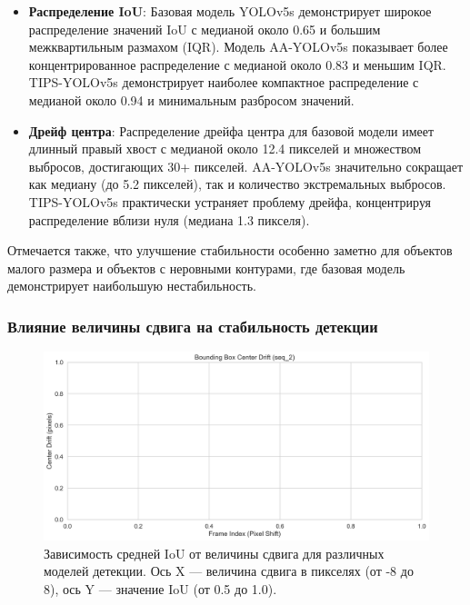\begin{itemize}
    \item \textbf{Распределение IoU}: Базовая модель YOLOv5s демонстрирует широкое распределение значений IoU с медианой около 0.65 и большим межквартильным размахом (IQR). Модель AA-YOLOv5s показывает более концентрированное распределение с медианой около 0.83 и меньшим IQR. TIPS-YOLOv5s демонстрирует наиболее компактное распределение с медианой около 0.94 и минимальным разбросом значений.
    
    \item \textbf{Дрейф центра}: Распределение дрейфа центра для базовой модели имеет длинный правый хвост с медианой около 12.4 пикселей и множеством выбросов, достигающих 30+ пикселей. AA-YOLOv5s значительно сокращает как медиану (до 5.2 пикселей), так и количество экстремальных выбросов. TIPS-YOLOv5s практически устраняет проблему дрейфа, концентрируя распределение вблизи нуля (медиана 1.3 пикселя).
\end{itemize}

Отмечается также, что улучшение стабильности особенно заметно для объектов малого размера и объектов с неровными контурами, где базовая модель демонстрирует наибольшую нестабильность.

\subsubsection{Влияние величины сдвига на стабильность детекции}
\label{sec:experiments:detection:shift_magnitude}

\begin{figure}[ht]
\centering
\includegraphics[width=\textwidth]{images/detection/center_drift_comparison_seq_2.png}
\caption{Зависимость средней IoU от величины сдвига для различных моделей детекции. Ось X — величина сдвига в пикселях (от -8 до 8), ось Y — значение IoU (от 0.5 до 1.0).}
\label{fig:iou_vs_shift}
\end{figure}

